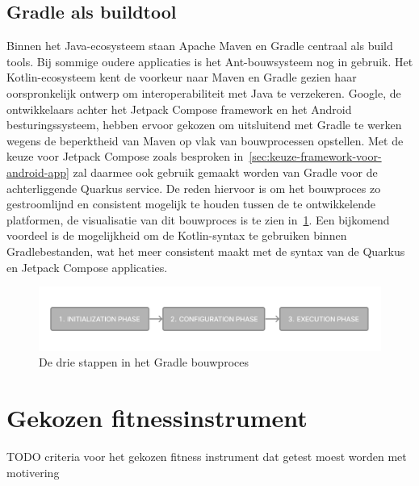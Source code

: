 \subsection{Gradle als buildtool}
\label{subsec:gradle}
Binnen het Java-ecosysteem staan Apache Maven en Gradle centraal als build tools.
Bij sommige oudere applicaties is het Ant-bouwsysteem nog in gebruik.
Het Kotlin-ecosysteem kent de voorkeur naar Maven en Gradle gezien haar oorspronkelijk ontwerp om interoperabiliteit met Java te verzekeren.
Google, de ontwikkelaars achter het Jetpack Compose framework en het Android besturingssysteem, hebben ervoor gekozen om uitsluitend met Gradle te werken wegens de beperktheid van Maven op vlak van bouwprocessen opstellen.
Met de keuze voor Jetpack Compose zoals besproken in~\ref{sec:keuze-framework-voor-android-app} zal daarmee ook gebruik gemaakt worden van Gradle voor de achterliggende Quarkus service.
De reden hiervoor is om het bouwproces zo gestroomlijnd en consistent mogelijk te houden tussen de te ontwikkelende platformen, de visualisatie van dit bouwproces is te zien in~\ref{fig:visualisatie-gradle-bouwproces}.
Een bijkomend voordeel is de mogelijkheid om de Kotlin-syntax te gebruiken binnen Gradlebestanden, wat het meer consistent maakt met de syntax van de Quarkus en Jetpack Compose applicaties.
\begin{figure}[H]
    \includegraphics[width=1\linewidth]{images/gradle-buildprocess}
    \caption{De drie stappen in het Gradle bouwproces~\autocite{Gradle}}
    \label{fig:visualisatie-gradle-bouwproces}
\end{figure}

\section{Gekozen fitnessinstrument}
\label{sec:gekozen-fitnessinstrument}
TODO criteria voor het gekozen fitness instrument dat getest moest worden met motivering %
